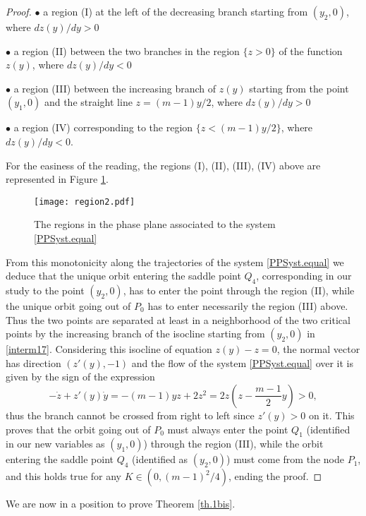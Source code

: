 \documentclass[a4paper,11pt]{article}
\numberwithin{equation}{section}
\begin{document}
\begin{proof}
$\bullet$ a region (I) at the left of the decreasing branch starting from $(y_2,0)$, where $dz(y)/dy>0$

$\bullet$ a region (II) between the two branches in the region $\{z>0\}$ of the function $z(y)$, where $dz(y)/dy<0$

$\bullet$ a region (III) between the increasing branch of $z(y)$ starting from the point $(y_1,0)$ and the straight line $z=(m-1)y/2$, where $dz(y)/dy>0$

$\bullet$ a region (IV) corresponding to the region $\{z<(m-1)y/2\}$, where $dz(y)/dy<0$.

For the easiness of the reading, the regions (I), (II), (III), (IV) above are represented in Figure \ref{fig2}.

\begin{figure}[ht!]
  \begin{center}
  \texttt{[image: region2.pdf]}
  \end{center}
  \caption{The regions in the phase plane associated to the system \eqref{PPSyst.equal}}\label{fig2}
\end{figure}

From this monotonicity along the trajectories of the system \eqref{PPSyst.equal} we deduce that the unique orbit entering the saddle point $Q_4$, corresponding in our study to the point $(y_2,0)$, has to enter the point through the region (II), while the unique orbit going out of $P_0$ has to enter necessarily the region (III) above. Thus the two points are separated at least in a neighborhood of the two critical points by the increasing branch of the isocline starting from $(y_2,0)$ in \eqref{interm17}. Considering this isocline of equation $z(y)-z=0$, the normal vector has direction $(z'(y),-1)$ and the flow of the system \eqref{PPSyst.equal} over it is given by the sign of the expression
$$
-\dot{z}+z'(y)\dot{y}=-(m-1)yz+2z^2=2z\left(z-\frac{m-1}{2}y\right)>0,
$$
thus the branch cannot be crossed from right to left since $z'(y)>0$ on it. This proves that the orbit going out of $P_0$ must always enter the point $Q_1$ (identified in our new variables as $(y_1,0)$) through the region (III), while the orbit entering the saddle point $Q_4$ (identified as $(y_2,0)$) must come from the node $P_1$, and this holds true for any $K\in(0,(m-1)^2/4)$, ending the proof.
\end{proof}
We are now in a position to prove Theorem \ref{th.1bis}.
\end{document}
